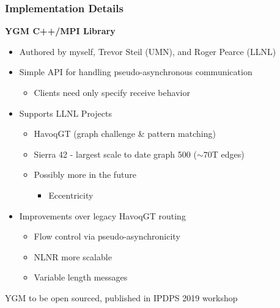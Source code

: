 \documentclass{beamer}
\newcommand{\algoname}[1]{\textnormal{\textsc{#1}}}
\begin{document}

\begin{frame}
\frametitle{Implementation Details}


\textbf{\algoname{YGM} C++/MPI Library}
\begin{itemize}
	\item Authored by myself, Trevor Steil (UMN), and Roger Pearce (LLNL)
	\item Simple API for handling pseudo-asynchronous communication
	\begin{itemize}
		\item Clients need only specify receive behavior
	\end{itemize}
	\item Supports LLNL Projects
	\begin{itemize}
		\item HavoqGT (graph challenge \& pattern matching)
		\item Sierra 42 - largest scale to date graph 500 ($\sim 70$T edges)
		\item Possibly more in the future
		\begin{itemize}
			\item Eccentricity
		\end{itemize}
	\end{itemize}
	\item Improvements over legacy HavoqGT routing
	\begin{itemize}
		\item Flow control via pseudo-asynchronicity 
		\item NLNR more scalable
		\item Variable length messages
	\end{itemize}
\end{itemize}

\begin{block}{}
	\begin{center}
		\algoname{YGM} to be open sourced, published in IPDPS 2019 workshop
	\end{center}
\end{block}

\end{frame}
\end{document}
